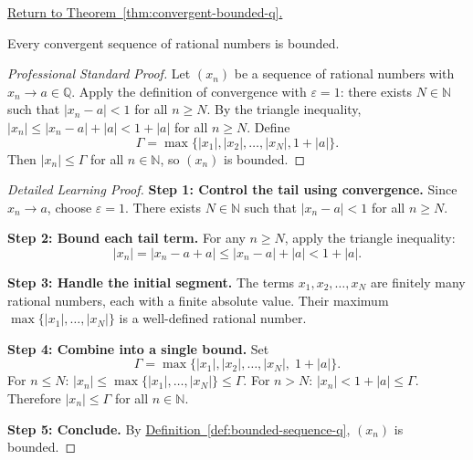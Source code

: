 
\newpage
{}
\label{prf:convergent-bounded-q}

\begin{remark*}[Return]
\hyperref[thm:convergent-bounded-q]{Return to Theorem~\ref*{thm:convergent-bounded-q}.}
\end{remark*}

\begin{theorem*}
Every convergent sequence of rational numbers is bounded.
\end{theorem*}

\begin{proof}[Professional Standard Proof]
\LRAProofBodyStart
Let $(x_n)$ be a sequence of rational numbers with $x_n \to a \in \mathbb{Q}$.
Apply the definition of convergence with $\varepsilon = 1$: there exists
$N \in \mathbb{N}$ such that $|x_n - a| < 1$ for all $n \geq N$.
By the triangle inequality, $|x_n| \leq |x_n - a| + |a| < 1 + |a|$
for all $n \geq N$.
Define
\[
\Gamma = \max\{|x_1|, |x_2|, \ldots, |x_N|, 1 + |a|\}.
\]
Then $|x_n| \leq \Gamma$ for all $n \in \mathbb{N}$, so $(x_n)$ is bounded.
\end{proof}

\begin{proof}[Detailed Learning Proof]
\LRAProofBodyStart
\textbf{Step 1: Control the tail using convergence.}
Since $x_n \to a$, choose $\varepsilon = 1$.  There exists $N \in \mathbb{N}$
such that $|x_n - a| < 1$ for all $n \geq N$.

\textbf{Step 2: Bound each tail term.}
For any $n \geq N$, apply the triangle inequality:
\[
|x_n| = |x_n - a + a| \leq |x_n - a| + |a| < 1 + |a|.
\]

\textbf{Step 3: Handle the initial segment.}
The terms $x_1, x_2, \ldots, x_N$ are finitely many rational numbers,
each with a finite absolute value.  Their maximum $\max\{|x_1|,\ldots,|x_N|\}$
is a well-defined rational number.

\textbf{Step 4: Combine into a single bound.}
Set
\[
\Gamma = \max\bigl\{|x_1|, |x_2|, \ldots, |x_N|,\; 1 + |a|\bigr\}.
\]
For $n \leq N$: $|x_n| \leq \max\{|x_1|,\ldots,|x_N|\} \leq \Gamma$.
For $n > N$: $|x_n| < 1 + |a| \leq \Gamma$.
Therefore $|x_n| \leq \Gamma$ for all $n \in \mathbb{N}$.

\textbf{Step 5: Conclude.}
By \hyperref[def:bounded-sequence-q]{Definition~\ref*{def:bounded-sequence-q}},
$(x_n)$ is bounded.
\end{proof}

